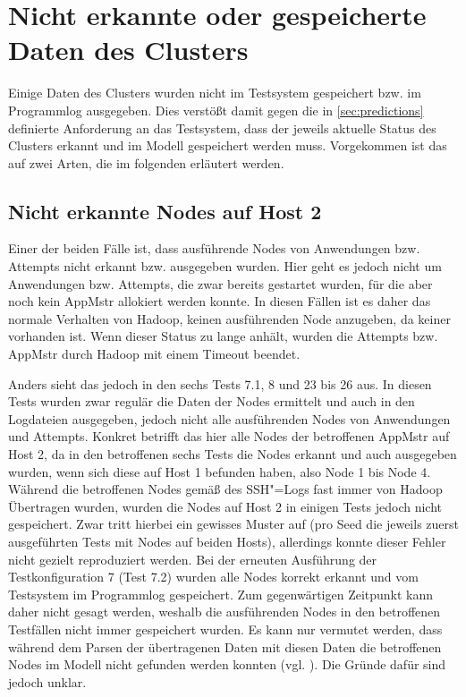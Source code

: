 \section{Nicht erkannte oder gespeicherte Daten des Clusters}
\label{sec:notDetectedData}

Einige Daten des Clusters wurden nicht im Testsystem gespeichert bzw. im Programmlog ausgegeben.
Dies verstößt damit gegen die in \autoref{sec:predictions} definierte Anforderung an das Testsystem, dass der jeweils aktuelle Status des Clusters erkannt und im Modell gespeichert werden muss.
Vorgekommen ist das auf zwei Arten, die im folgenden erläutert werden.

\subsection{Nicht erkannte Nodes auf Host 2}
\label{sec:notDetectedHost2}

Einer der beiden Fälle ist, dass ausführende Nodes von Anwendungen bzw. Attempts nicht erkannt bzw. ausgegeben wurden.
Hier geht es jedoch nicht um Anwendungen bzw. Attempts, die zwar bereits gestartet wurden, für die aber noch kein \ac{AppMstr} allokiert werden konnte.
In diesen Fällen ist es daher das normale Verhalten von Hadoop, keinen ausführenden Node anzugeben, da keiner vorhanden ist.
Wenn dieser Status zu lange anhält, wurden die Attempts bzw. \ac{AppMstr} durch Hadoop mit einem Timeout beendet.

Anders sieht das jedoch in den sechs Tests 7.1, 8 und 23 bis 26 aus.
In diesen Tests wurden zwar regulär die Daten der Nodes ermittelt und auch in den Logdateien ausgegeben, jedoch nicht alle ausführenden Nodes von Anwendungen und Attempts.
Konkret betrifft das hier alle Nodes der betroffenen \ac{AppMstr} auf Host 2, da in den betroffenen sechs Tests die Nodes erkannt und auch ausgegeben wurden, wenn sich diese auf Host 1 befunden haben, also Node 1 bis Node 4.
Während die betroffenen Nodes gemäß des SSH"=Logs fast immer von Hadoop Übertragen wurden, wurden die Nodes auf Host 2 in einigen Tests jedoch nicht gespeichert.
Zwar tritt hierbei ein gewisses Muster auf (pro Seed die jeweils zuerst ausgeführten Tests mit Nodes auf beiden Hosts), allerdings konnte dieser Fehler nicht gezielt reproduziert werden.
Bei der erneuten Ausführung der Testkonfiguration 7 (Test 7.2) wurden alle Nodes korrekt erkannt und vom Testsystem im Programmlog gespeichert.
Zum gegenwärtigen Zeitpunkt kann daher nicht gesagt werden, weshalb die ausführenden Nodes in den betroffenen Testfällen nicht immer gespeichert wurden.
Es kann nur vermutet werden, dass während dem Parsen der übertragenen Daten mit diesen Daten die betroffenen Nodes im Modell nicht gefunden werden konnten (vgl. ).
Die Gründe dafür sind jedoch unklar.


